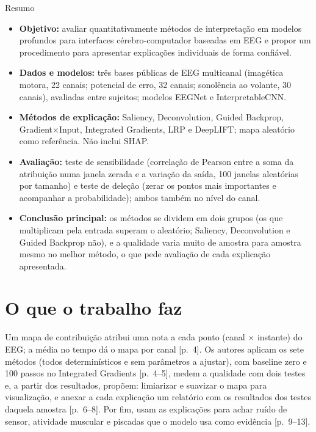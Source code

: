 \documentclass[11pt,a4paper]{article}
\begin{document}
\begin{infobox}[note]{Resumo}
\begin{itemize}
\item \textbf{Objetivo:} avaliar quantitativamente métodos de interpretação em modelos profundos para interfaces cérebro-computador baseadas em EEG e propor um procedimento para apresentar explicações individuais de forma confiável.
\item \textbf{Dados e modelos:} três bases públicas de EEG multicanal (imagética motora, 22 canais; potencial de erro, 32 canais; sonolência ao volante, 30 canais), avaliadas entre sujeitos; modelos EEGNet e InterpretableCNN.
\item \textbf{Métodos de explicação:} Saliency, Deconvolution, Guided Backprop, Gradient$\times$Input, Integrated Gradients, LRP e DeepLIFT; mapa aleatório como referência. Não inclui SHAP.
\item \textbf{Avaliação:} teste de sensibilidade (correlação de Pearson entre a soma da atribuição numa janela zerada e a variação da saída, 100 janelas aleatórias por tamanho) e teste de deleção (zerar os pontos mais importantes e acompanhar a probabilidade); ambos também no nível do canal.
\item \textbf{Conclusão principal:} os métodos se dividem em dois grupos (os que multiplicam pela entrada superam o aleatório; Saliency, Deconvolution e Guided Backprop não), e a qualidade varia muito de amostra para amostra mesmo no melhor método, o que pede avaliação de cada explicação apresentada.
\end{itemize}
\end{infobox}

\section{O que o trabalho faz}
Um mapa de contribuição atribui uma nota a cada ponto (canal $\times$ instante) do EEG; a média no tempo dá o mapa por canal [p.~4]. Os autores aplicam os sete métodos (todos determinísticos e sem parâmetros a ajustar), com baseline zero e 100 passos no Integrated Gradients [p.~4--5], medem a qualidade com dois testes e, a partir dos resultados, propõem: limiarizar e suavizar o mapa para visualização, e anexar a cada explicação um relatório com os resultados dos testes daquela amostra [p.~6--8]. Por fim, usam as explicações para achar ruído de sensor, atividade muscular e piscadas que o modelo usa como evidência [p.~9--13].
\end{document}
